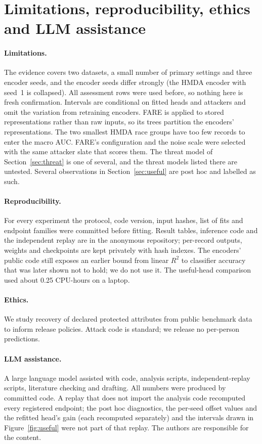 \documentclass[10pt]{article}
\begin{document}
\section{Limitations, reproducibility, ethics and LLM assistance}\label{sec:limits}

\paragraph{Limitations.} The evidence covers two datasets, a small number of primary settings and three encoder seeds,
and the encoder seeds differ strongly (the HMDA encoder with seed~1 is collapsed). All assessment rows were used
before, so nothing here is fresh confirmation. Intervals are conditional on fitted heads and attackers and omit the
variation from retraining encoders. FARE is applied to stored representations rather than raw inputs, so its trees
partition the encoders' representations. The two smallest HMDA race groups have too few records to enter the macro AUC.
FARE's configuration and the noise scale were selected with the same attacker slate that scores them. The threat model
of Section~\ref{sec:threat} is one of several, and the threat models listed there are untested.
Several observations in Section~\ref{sec:useful} are post hoc and labelled as such.

\paragraph{Reproducibility.} For every experiment the protocol, code version, input hashes, list of fits and endpoint
families were committed before fitting. Result tables, inference code and the independent replay are in the
anonymous repository; per-record outputs, weights and checkpoints are kept privately with hash indexes. The encoders' public code still exposes an earlier bound from linear $R^2$ to classifier
accuracy that was later shown not to hold; we do not use it. The useful-head
comparison used about 0.25 CPU-hours on a laptop.

\paragraph{Ethics.} We study recovery of declared protected attributes from public benchmark data to inform release
policies. Attack code is standard; we release no per-person predictions.

\paragraph{LLM assistance.} A large language model assisted with code, analysis scripts, independent-replay scripts,
literature checking and drafting. All numbers were produced by committed code. A replay that does not import the analysis code
recomputed every registered endpoint; the post hoc diagnostics, the per-seed offset values and the refitted head's gain
(each recomputed separately) and the intervals drawn in Figure~\ref{fig:useful} were not part of that replay. The
authors are responsible for the content.



\end{document}
